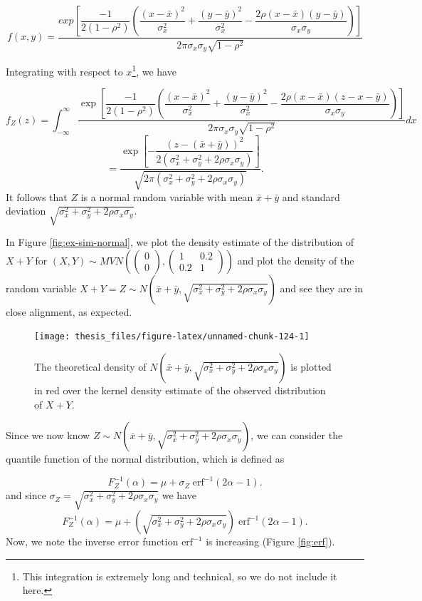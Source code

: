 \documentclass[12pt,twoside]{smiththesis}
\begin{document}
\[f(x,y) = \dfrac{exp\left[\dfrac{-1}{2(1-\rho^2)} \left( \dfrac{(x-\bar x)^2}{\sigma_x^2}+\dfrac{(y-\bar y)^2}{\sigma_x^2} - \dfrac{2 \rho (x-\bar x)(y-\bar y)}{\sigma_x\sigma_y} \right)\right]}{2\pi \sigma_x \sigma_y \sqrt{1- \rho^2}}\]

Integrating with respect to \(x\)\footnote{This integration is extremely long and technical, so we do not include it here.}, we have

\[f_Z(z)  = \int_{-\infty}^\infty \dfrac{\exp\left[\dfrac{-1}{2(1-\rho^2)} \left( \dfrac{(x-\bar x)^2}{\sigma_x^2}+\dfrac{(y-\bar y)^2}{\sigma_x^2} - \dfrac{2 \rho (x-\bar x)(z-x-\bar y)}{\sigma_x\sigma_y} \right)\right]}{2\pi \sigma_x \sigma_y \sqrt{1- \rho^2}} dx \]
\[=\dfrac{\exp\left[-\dfrac{(z-(\bar x + \bar y ))^2}{2(\sigma^2_x+\sigma^2_y + 2\rho \sigma_x \sigma_y)}\right]}{\sqrt{2\pi(\sigma_x^2 + \sigma_y^2 + 2\rho \sigma_x \sigma_y)}}.\]
It follows that \(Z\) is a normal random variable with mean \(\bar x + \bar y\) and standard deviation \(\sqrt{\sigma_x^2 +\sigma_y^2 + 2 \rho \sigma_x \sigma_y }\).

In Figure \ref{fig:ex-sim-normal}, we plot the density estimate of the distribution of \(X+Y\) for \((X,Y) \sim MVN\left( \begin{pmatrix} 0\\0 \end{pmatrix}, \begin{pmatrix} 1 & 0.2 \\0.2 & 1 \end{pmatrix}\right)\) and plot the density of the random variable \(X+Y = Z \sim N\left(\bar x + \bar y,\sqrt{\sigma_x^2 +\sigma_y^2 + 2 \rho \sigma_x \sigma_y }\right)\) and see they are in close alignment, as expected.
\begin{figure}

{\centering \texttt{[image: thesis\_files/figure-latex/unnamed-chunk-124-1]} 

}

\caption{\label{fig:ex-sim-normal} The theoretical density of $N\left(\bar x + \bar y,\sqrt{\sigma_x^2 +\sigma_y^2 + 2 \rho \sigma_x \sigma_y }\right)$ is plotted in red over the kernel density estimate of the observed distribution of $X+Y$.}\label{fig:unnamed-chunk-124}
\end{figure}
Since we now know \(Z \sim N\left(\bar x + \bar y,\sqrt{\sigma_x^2 +\sigma_y^2 + 2 \rho \sigma_x \sigma_y }\right)\), we can consider the quantile function of the normal distribution, which is defined as

\[F_Z^{-1}(\alpha)=\mu +\sigma_Z \; \text{erf}^{-1}(2\alpha - 1).\]
and since \(\sigma_Z=\sqrt{\sigma_x^2 +\sigma_y^2 + 2 \rho \sigma_x \sigma_y }\) we have
\[F_Z^{-1}(\alpha)=\mu + \left(\sqrt{\sigma_x^2 +\sigma_y^2 + 2 \rho \sigma_x \sigma_y } \right) \; \text{erf}^{-1}(2\alpha - 1).\]
Now, we note the inverse error function \(\text{erf}^{-1}\) is increasing (Figure \ref{fig:erf}).
\end{document}
